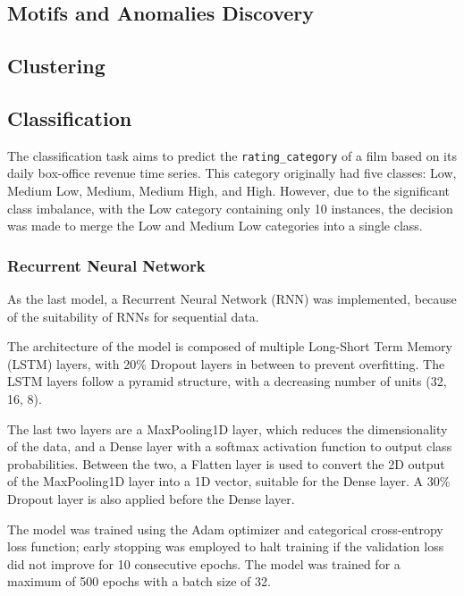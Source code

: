 \subsection{Motifs and Anomalies Discovery}



\subsection{Clustering}

\subsection{Classification}

The classification task aims to predict the \texttt{rating\_category} of a film based on its daily box-office revenue time series.
This category originally had five classes: Low, Medium Low, Medium, Medium High, and High.
However, due to the significant class imbalance, with the Low category containing only 10 instances,
the decision was made to merge the Low and Medium Low categories into a single class.


\subsubsection{Recurrent Neural Network}
As the last model, a Recurrent Neural Network (RNN) was implemented,
because of the suitability of RNNs for sequential data.

The architecture of the model is composed of multiple Long-Short Term Memory (LSTM)
layers, with 20\% Dropout layers in between to prevent overfitting.
The LSTM layers follow a pyramid structure, with a decreasing number of units
(32, 16, 8).

The last two layers are a MaxPooling1D layer, which reduces the dimensionality
of the data, and a Dense layer with a softmax activation function to output
class probabilities.
Between the two, a Flatten layer is used to convert the 2D output of the
MaxPooling1D layer into a 1D vector, suitable for the Dense layer. A 30\%
Dropout layer is also applied before the Dense layer.


The model was trained using the Adam optimizer and categorical cross-entropy
loss function; early stopping was employed to halt training if the validation
loss did not improve for 10 consecutive epochs.
The model was trained for a maximum of 500 epochs with a batch size of 32.

